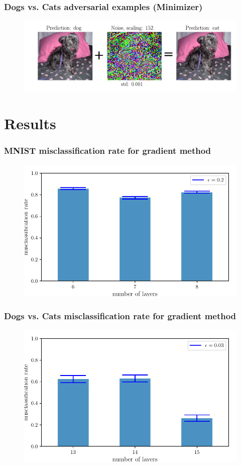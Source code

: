 \documentclass[handout]{beamer}
\begin{document}
\begin{frame}
\frametitle{Dogs vs. Cats adversarial examples (Minimizer)} 
\begin{figure}
\includegraphics[width=\linewidth]{../figures/adv_example_minimizer_dogs_vs_cats.pdf}
\end{figure}
\end{frame}

\section{Results}

\begin{frame}
\frametitle{MNIST misclassification rate for gradient method} 
\begin{figure}
\includegraphics[width=0.9\linewidth]{../figures/mnist_grad_misclassificationrate.pdf}
\end{figure}
\end{frame}

\begin{frame}
\frametitle{Dogs vs. Cats misclassification rate for gradient method} 
\begin{figure}
\includegraphics[width=0.9\linewidth]{../figures/cvd_grad_misclassificationrate.pdf}
\end{figure}
\end{frame}
\end{document}

